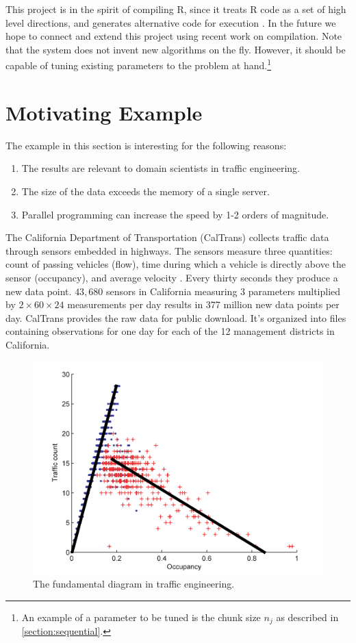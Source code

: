 \documentclass[12pt]{article}
\begin{document}
This project is in the spirit of compiling R, since it treats R code as a
set of high level directions, and generates alternative code for execution
\cite{lang2014enhancing}. In the future we hope to connect and extend this
project using recent work on compilation. Note that the system does not
invent new algorithms on the fly. However, it should be capable of tuning
existing parameters to the problem at hand.\footnote{An example of a
parameter to be tuned is the chunk size $n_j$ as described in
\ref{section:sequential}.} 

\section{Motivating Example}
\label{sec:pems}

The example in this section is interesting for the following reasons:
\begin{enumerate}
    \item The results are relevant to domain scientists in traffic engineering.
    \item The size of the data exceeds the memory of a single server.
    \item Parallel programming can increase the speed by 1-2 orders of
        magnitude.
\end{enumerate}

The California Department of Transportation (CalTrans) collects traffic data through
sensors embedded in highways. The sensors measure three quantities: count
of passing vehicles (flow), time during which a vehicle is directly above the
sensor (occupancy), and average velocity \cite{jia2001pems}.  Every thirty
seconds they produce a new data point. $43,680$ sensors in California
measuring 3 parameters multiplied by $2 \times 60 \times 24$ measurements
per day results in 377 million new data points per day.  CalTrans provides
the raw data for public download. It's organized into files containing
observations for one day for each of the 12 management districts in
California.

\begin{figure}
\centering
\includegraphics[width=.7\linewidth]{seminar/fundamental_diagram}
\caption{The fundamental diagram in traffic engineering.}
\label{fig:fundamental_diagram}
\end{figure}
\end{document}
